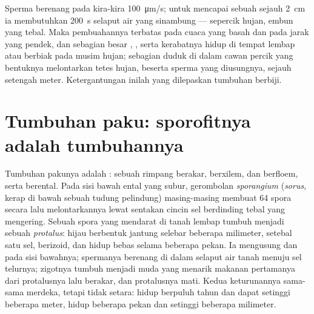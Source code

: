 \begin{example}\label{ex:b2:plant-life-cycles:sperm}
Sperma  berenang pada kira-kira \qty{100}{\micro m/s}; untuk
mencapai sebuah  sejauh \qty{2}{cm} ia membutuhkan
\qty{200}{s} selaput air yang sinambung --- sepercik hujan, embun yang
tebal. Maka pembuahannya terbatas pada cuaca yang basah dan pada jarak
yang pendek, dan sebagian besar , , serta kerabatnya
hidup di tempat lembap atau berbiak pada musim hujan; 
sebagian  duduk di dalam cawan percik yang bentuknya melontarkan
tetes hujan, beserta sperma yang diusungnya, sejauh setengah meter.
Ketergantungan inilah yang dilepaskan tumbuhan berbiji.
\end{example}

\section{Tumbuhan paku: sporofitnya adalah tumbuhannya}

\begin{definition}\label{def:b2:plant-life-cycles:fern}
Tumbuhan pakunya adalah \emph{}: sebuah rimpang berakar,
berxilem, dan berfloem, serta berental. Pada sisi bawah ental yang
subur, gerombolan \emph{sporangium} (\emph{sorus}, kerap di bawah
sebuah tudung pelindung) masing-masing membuat 64 spora secara 
lalu melontarkannya lewat sentakan cincin sel berdinding tebal yang
mengering. Sebuah spora yang mendarat di tanah lembap tumbuh menjadi
sebuah \emph{protalus}:  hijau berbentuk jantung selebar
beberapa milimeter, setebal satu sel, berizoid, dan hidup bebas selama
beberapa pekan. Ia mengusung  dan  pada sisi
bawahnya; spermanya berenang di dalam selaput air tanah menuju sel
telurnya; zigotnya tumbuh menjadi  muda yang menarik makanan
pertamanya dari protalusnya lalu berakar, dan protalusnya mati. Kedua
keturunannya sama-sama merdeka, tetapi tidak setara:  hidup
berpuluh tahun dan dapat setinggi beberapa meter,  hidup
beberapa pekan dan setinggi beberapa milimeter.
\end{definition}

